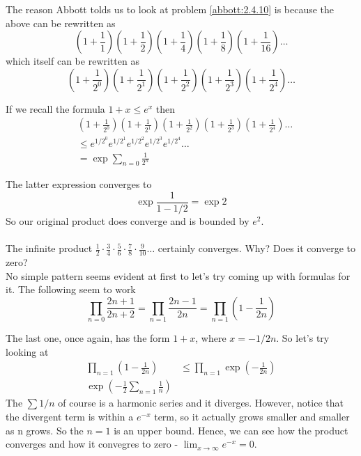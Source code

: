 The reason Abbott tolds us to look at problem \ref{abbott:2.4.10} is because the above can be rewritten as
$$
\left(1 + \frac{1}{1} \right) \left(1 + \frac{1}{2} \right) \left(1 + \frac{1}{4} \right)
\left(1 + \frac{1}{8} \right) \left(1 + \frac{1}{16} \right) \ldots
$$
which itself can be rewritten as
$$
\left(1 + \frac{1}{2^0} \right) \left(1 + \frac{1}{2^1} \right) \left(1 + \frac{1}{2^2} \right)
\left(1 + \frac{1}{2^3} \right) \left(1 + \frac{1}{2^4} \right) \ldots
$$

If we recall the formula $1 + x \leq e^x$ then
\begin{align*}
& \left(1 + \frac{1}{2^0} \right) \left(1 + \frac{1}{2^1} \right) \left(1 + \frac{1}{2^2} \right)
\left(1 + \frac{1}{2^3} \right) \left(1 + \frac{1}{2^4} \right) \ldots  \\
&\leq e^{1/2^0} e^{1/2^1} e^{1/2^2} e^{1/2^3} e^{1/2^4} \ldots \\
&= \exp{\sum_{n=0} \frac{1}{2^n}}
\end{align*}

The latter expression converges to
$$
\exp{\frac{1}{1 - 1/2}} = \exp{2}
$$
So our original product does converge and is bounded by $e^2$.
\\~\\


The infinite product
$\frac{1}{2}\cdot \frac{3}{4}\cdot \frac{5}{6}\cdot \frac{7}{8}\cdot \frac{9}{10}\ldots$
certainly converges. Why?
Does it converge to zero?
\\

No simple pattern seems evident at first to let's try coming up with formulas for it.
The following seem to work
$$
\prod_{n=0} \frac{2n+1}{2n+2}
= \prod_{n=1} \frac{2n - 1}{2n}
= \prod_{n=1} \left( 1 - \frac{1}{2n} \right)
$$

The last one, once again, has the form $1+x$, where $x = - 1/2n$.
So let's try looking at
\begin{align*}
\prod_{n=1} \left( 1 - \frac{1}{2n} \right) &\leq \prod_{n=1} \exp \left( -\frac{1}{2n} \right) \\
\exp \left( -\frac{1}{2} \sum_{n=1} \frac{1}{n} \right)
\end{align*}
The $\sum 1/n$ of course is a harmonic series and it diverges.
However, notice that the divergent term is within a $e^{-x}$ term, so it actually grows smaller
and smaller as n grows.
So the $n=1$ is an upper bound.
Hence, we can see how the product converges and how it convegres to zero -
$\lim_{x\rightarrow\infty} e^{-x} = 0$.
\\~\\


